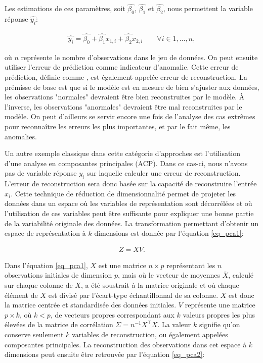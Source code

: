 Les estimations de ces paramètres, soit $\hat{\beta_0}$, $\hat{\beta_1}$ et $\hat{\beta_2}$, nous permettent \DIFdelbegin {}\DIFdelend \DIFaddbegin {}\DIFaddend la variable réponse $\hat{y_i}$: 

\begin{gather}  \label{eq_reghat}
\hat{y_i} = \hat{\beta_0} + \hat{\beta_{1}} x_{1,i} + \hat{\beta_2} x_{2,i} \qquad \forall i \in {1,...,n},
\end{gather}

où $n$ représente le nombre d'observations dans le jeu de données. On peut ensuite utiliser l'erreur de prédiction comme indicateur d'anomalie. Cette erreur de prédiction, définie comme \DIFdelbegin {}\DIFdelend \DIFaddbegin {}\DIFaddend , est également appelée erreur de reconstruction. La prémisse de base est que si le modèle est en mesure de bien s'ajuster aux données, les observations "normales" devraient être bien reconstruites par le modèle. À l'inverse, les observations "anormales" devraient être mal reconstruites par le modèle.  On peut d'ailleurs se servir encore une fois de l'analyse des cas extrêmes pour reconnaître les erreurs les plus importantes, et par le fait même, les anomalies.

Un autre exemple classique dans cette catégorie d'approches est l'utilisation d'une analyse en composantes principales (ACP). Dans ce cas-ci, nous n'avons pas de variable réponse $y_i$ sur laquelle calculer une erreur de reconstruction. L'erreur de reconstruction sera donc basée sur la capacité de reconstruire l'entrée $x_i$. Cette technique de réduction de dimensionnalité permet de projeter les données dans un espace où les variables de représentation sont décorrélées et où l'utilisation \DIFaddbegin {}\DIFaddend de ces variables peut être suffisante pour expliquer une bonne partie de la variabilité originale des données. La transformation permettant d'obtenir un espace de représentation à $k$ dimensions est donnée par l'équation \ref{eq_pca1}:

 \begin{gather}  \label{eq_pca1}
 Z = XV.
 \end{gather}

Dans l'équation \ref{eq_pca1}, $X$ est une matrice $n \times p$ représentant les $n$  observations initiales de dimension $p$, mais où le vecteur de moyennes $\bar{X}$, calculé sur chaque colonne de $X$, a été soustrait à la matrice originale et où chaque élément de $X$ est divisé par l'écart-type échantillonnal de sa colonne. $X$ est donc la matrice centrée et standardisée des données initiales. $V$ représente une matrice $p \times k$, où $k < p$, de  vecteurs propres correspondant aux $k$ valeurs propres les plus élevées de la matrice de corrélation $\Sigma = n^{-1}X^\top X$. La valeur $k$ signifie qu'on conserve seulement $k$ variables de reconstruction, ou également appelées composantes principales. La reconstruction des observations dans cet espace à $k$ dimensions peut ensuite être retrouvée par l'équation \ref{eq_pca2}:

